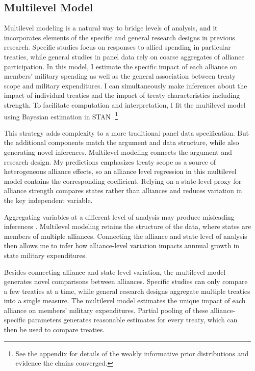 \documentclass[12pt]{article}
\begin{document}
\subsection{Multilevel Model} 


Multilevel modeling is a natural way to bridge levels of analysis, and it incorporates elements of the specific and general research designs in previous research. 
Specific studies focus on responses to allied spending in particular treaties, while general studies in panel data rely on coarse aggregates of alliance participation.
In this model, I estimate the specific impact of each alliance on members' military spending as well as the general association between treaty scope and military expenditures. 
I can simultaneously make inferences about the impact of individual treaties and the impact of treaty characteristics including strength. 
To facilitate computation and interpretation, I fit the multilevel model using Bayesian estimation in STAN \citep{Carpenteretal2016}.\footnote{See the appendix for details of the weakly informative prior distributions and evidence the chains converged.}


This strategy adds complexity to a more traditional panel data specification. 
But the additional components match the argument and data structure, while also generating novel inferences. 
Multilevel modeling connects the argument and research design. 
My predictions emphasizes treaty scope as a source of heterogeneous alliance effects, so an alliance level regression in this multilevel model contains the corresponding coefficient.
Relying on a state-level proxy for alliance strength compares states rather than alliances and reduces variation in the key independent variable.


Aggregating variables at a different level of analysis may produce misleading inferences \citep{McElreath2016}. 
Multilevel modeling retains the structure of the data, where states are members of multiple alliances. 
Connecting the alliance and state level of analysis then allows me to infer how alliance-level variation impacts annnual growth in state military expenditures. 


Besides connecting alliance and state level variation, the multilevel model generates novel comparisons between alliances. 
Specific studies can only compare a few treaties at a time, while general research designs aggregate multiple treaties into a single measure. 
The multilevel model estimates the unique impact of each alliance on members' military expenditures. 
Partial pooling of these alliance-specific parameters generates reasonable estimates for every treaty, which can then be used to compare treaties. 
\end{document}
